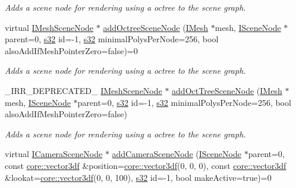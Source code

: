 \begin{DoxyCompactItemize}
\begin{DoxyCompactList}\small\item\em Adds a scene node for rendering using a octree to the scene graph. \end{DoxyCompactList}\item 
virtual \hyperlink{classirr_1_1scene_1_1IMeshSceneNode}{I\+Mesh\+Scene\+Node} $\ast$ \hyperlink{classirr_1_1scene_1_1ISceneManager_abfa8d1ebb1ff681d588aea98e6e2b193}{add\+Octree\+Scene\+Node} (\hyperlink{classirr_1_1scene_1_1IMesh}{I\+Mesh} $\ast$mesh, \hyperlink{classirr_1_1scene_1_1ISceneNode}{I\+Scene\+Node} $\ast$parent=0, \hyperlink{namespaceirr_ac66849b7a6ed16e30ebede579f9b47c6}{s32} id=-\/1, \hyperlink{namespaceirr_ac66849b7a6ed16e30ebede579f9b47c6}{s32} minimal\+Polys\+Per\+Node=256, bool also\+Add\+If\+Mesh\+Pointer\+Zero=false)=0
\begin{DoxyCompactList}\small\item\em Adds a scene node for rendering using a octree to the scene graph. \end{DoxyCompactList}\item 
\+\_\+\+I\+R\+R\+\_\+\+D\+E\+P\+R\+E\+C\+A\+T\+E\+D\+\_\+ \hyperlink{classirr_1_1scene_1_1IMeshSceneNode}{I\+Mesh\+Scene\+Node} $\ast$ \hyperlink{classirr_1_1scene_1_1ISceneManager_af2f5dfc8d5d0f525aee59058fd7457cd}{add\+Oct\+Tree\+Scene\+Node} (\hyperlink{classirr_1_1scene_1_1IMesh}{I\+Mesh} $\ast$mesh, \hyperlink{classirr_1_1scene_1_1ISceneNode}{I\+Scene\+Node} $\ast$parent=0, \hyperlink{namespaceirr_ac66849b7a6ed16e30ebede579f9b47c6}{s32} id=-\/1, \hyperlink{namespaceirr_ac66849b7a6ed16e30ebede579f9b47c6}{s32} minimal\+Polys\+Per\+Node=256, bool also\+Add\+If\+Mesh\+Pointer\+Zero=false)
\begin{DoxyCompactList}\small\item\em Adds a scene node for rendering using a octree to the scene graph. \end{DoxyCompactList}\item 
virtual \hyperlink{classirr_1_1scene_1_1ICameraSceneNode}{I\+Camera\+Scene\+Node} $\ast$ \hyperlink{classirr_1_1scene_1_1ISceneManager_afc3733849319078d5d22d94f58c7d1f2}{add\+Camera\+Scene\+Node} (\hyperlink{classirr_1_1scene_1_1ISceneNode}{I\+Scene\+Node} $\ast$parent=0, const \hyperlink{namespaceirr_1_1core_a06f169d08b5c429f5575acb7edbad811}{core\+::vector3df} \&position=\hyperlink{namespaceirr_1_1core_a06f169d08b5c429f5575acb7edbad811}{core\+::vector3df}(0, 0, 0), const \hyperlink{namespaceirr_1_1core_a06f169d08b5c429f5575acb7edbad811}{core\+::vector3df} \&lookat=\hyperlink{namespaceirr_1_1core_a06f169d08b5c429f5575acb7edbad811}{core\+::vector3df}(0, 0, 100), \hyperlink{namespaceirr_ac66849b7a6ed16e30ebede579f9b47c6}{s32} id=-\/1, bool make\+Active=true)=0

\end{DoxyCompactItemize}
